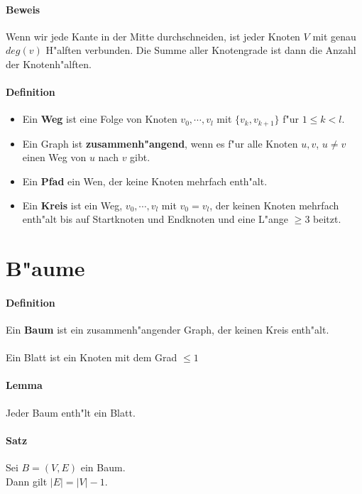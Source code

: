 \paragraph{Beweis} \parskp
Wenn wir jede Kante in der Mitte durchschneiden, ist jeder Knoten $V$ mit genau $deg(v)$ H"alften verbunden.
Die Summe aller Knotengrade ist dann die Anzahl der Knotenh"alften.

\paragraph{Definition}
\begin{itemize}
    \item Ein \textbf{Weg} ist eine Folge von Knoten $v_0,\cdots,v_l$ mit $\{v_k,v_{k+1}\}$ f"ur $1\le k<l$.
    \item Ein Graph ist \textbf{zusammenh"angend}, wenn es f"ur alle Knoten $u,v$, $u\ne v$ einen Weg von $u$
          nach $v$ gibt.
    \item Ein \textbf{Pfad} ein Wen, der keine Knoten mehrfach enth"alt.
    \item Ein \textbf{Kreis} ist ein Weg, $v_0,\cdots,v_l$ mit $v_0=v_l$, der keinen Knoten mehrfach enth"alt
          bis auf Startknoten und Endknoten und eine L"ange $\ge3$ beitzt.
\end{itemize}

\section{B"aume}

\paragraph{Definition} \parskp
Ein \textbf{Baum} ist ein zusammenh"angender Graph, der keinen Kreis enth"alt.\\
\\
Ein Blatt ist ein Knoten mit dem Grad $\le1$

\paragraph{Lemma} Jeder Baum enth"lt ein Blatt.

\paragraph{Satz} Sei $B=(V,E)$ ein Baum. \\
Dann gilt $|E|=|V|-1$.

